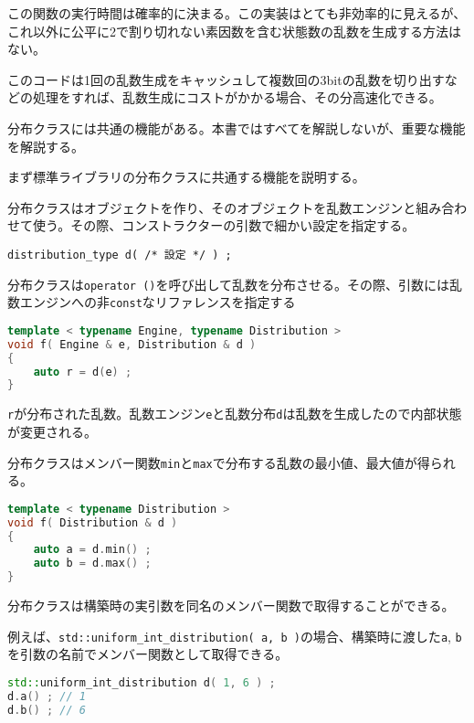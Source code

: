 この関数の実行時間は確率的に決まる。この実装はとても非効率的に見えるが、これ以外に公平に2で割り切れない素因数を含む状態数の乱数を生成する方法はない。

このコードは1回の乱数生成をキャッシュして複数回の3bitの乱数を切り出すなどの処理をすれば、乱数生成にコストがかかる場合、その分高速化できる。


分布クラスには共通の機能がある。本書ではすべてを解説しないが、重要な機能を解説する。

まず標準ライブラリの分布クラスに共通する機能を説明する。

分布クラスはオブジェクトを作り、そのオブジェクトを乱数エンジンと組み合わせて使う。その際、コンストラクターの引数で細かい設定を指定する。

\begin{lstlisting}[style=grammar]
distribution_type d( /* 設定 */ ) ;
\end{lstlisting}

分布クラスは\texttt{operator ()}を呼び出して乱数を分布させる。その際、引数には乱数エンジンへの非\texttt{const}なリファレンスを指定する

\begin{lstlisting}[language={C++}]
template < typename Engine, typename Distribution >
void f( Engine & e, Distribution & d )
{
    auto r = d(e) ;
}
\end{lstlisting}

\texttt{r}が分布された乱数。乱数エンジン\texttt{e}と乱数分布\texttt{d}は乱数を生成したので内部状態が変更される。

分布クラスはメンバー関数\texttt{min}と\texttt{max}で分布する乱数の最小値、最大値が得られる。

\begin{lstlisting}[language={C++}]
template < typename Distribution >
void f( Distribution & d )
{
    auto a = d.min() ;
    auto b = d.max() ;
}
\end{lstlisting}

分布クラスは構築時の実引数を同名のメンバー関数で取得することができる。

例えば、\texttt{std::uniform\_int\_distribution( a, b )}の場合、構築時に渡した\texttt{a}, \texttt{b}を引数の名前でメンバー関数として取得できる。

\begin{lstlisting}[language={C++}]
std::uniform_int_distribution d( 1, 6 ) ;
d.a() ; // 1
d.b() ; // 6
\end{lstlisting}

